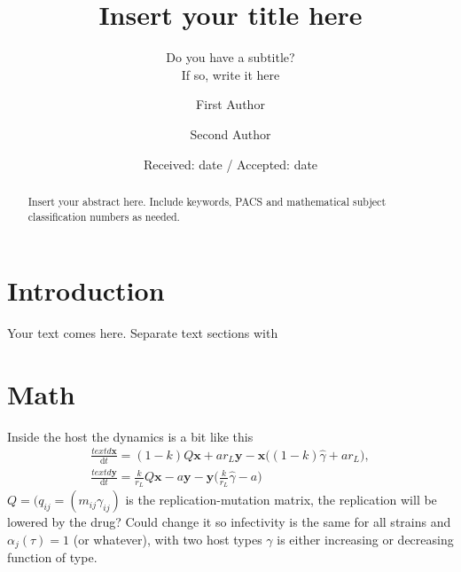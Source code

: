 \documentclass[twocolumn]{svjour3}          %
\begin{document}
\title{Insert your title here
}
%

\subtitle{Do you have a subtitle?\\ If so, write it here}


\author{First Author         \and
        Second Author %
}



\date{Received: date / Accepted: date}

\maketitle

\begin{abstract}
Insert your abstract here. Include keywords, PACS and mathematical
subject classification numbers as needed.
\end{abstract}

\section{Introduction}
\label{intro}
Your text comes here. Separate text sections with
\section{Math}
\label{sec:1}

Inside the host the dynamics is a bit like this 
\begin{gather*}
\frac{text{d} \bm{x}}{ \text{d} t} = (1-k)Q \bm{x} + ar_L \bm{y}-\bm{x} \big((1-k)\hat{\gamma} + a r_L \big), \\
\frac{text{d} \bm{y}}{ \text{d} t} = \frac{k}{r_L}Q \bm{x} - a \bm{y}-\bm{y} \big(\frac{k}{r_L}\hat{\gamma} - a \big)
\end{gather*}
$Q=( q_{ij} = (m_{ij}\gamma_{ij})$ is the replication-mutation matrix, the replication  will  be lowered  by the drug? Could change it so infectivity is the same for all strains and $\alpha_j(\tau) = 1$ (or whatever), with two host types $\gamma$ is either increasing or decreasing function of type.
\end{document}
